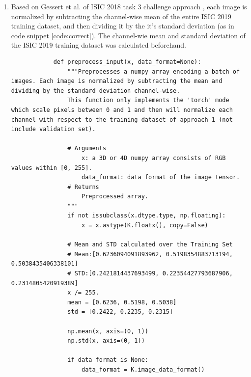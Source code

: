 \begin{enumerate}
    \item Based on Gessert et al. of ISIC 2018 task 3 challenge approach \cite{gessert2018}, each image is normalized by subtracting the channel-wise mean of the entire ISIC 2019 training dataset, and then dividing it by the it's standard deviation (as in code snippet \ref{code:correct}). The channel-wie mean and standard deviation of the ISIC 2019 training dataset was calculated beforehand. \par
    
        \begin{listing}[ht]
        \begin{verbatim}
            def preprocess_input(x, data_format=None):
                """Preprocesses a numpy array encoding a batch of images. Each image is normalized by subtracting the mean and dividing by the standard deviation channel-wise.
                This function only implements the 'torch' mode which scale pixels between 0 and 1 and then will normalize each channel with respect to the training dataset of approach 1 (not include validation set).
            
                # Arguments
                    x: a 3D or 4D numpy array consists of RGB values within [0, 255].
                    data_format: data format of the image tensor.
                # Returns
                    Preprocessed array.
                """
                if not issubclass(x.dtype.type, np.floating):
                    x = x.astype(K.floatx(), copy=False)
            
                # Mean and STD calculated over the Training Set
                # Mean:[0.6236094091893962, 0.5198354883713194, 0.5038435406338101]
                # STD:[0.2421814437693499, 0.22354427793687906, 0.2314805420919389]
                x /= 255.
                mean = [0.6236, 0.5198, 0.5038]
                std = [0.2422, 0.2235, 0.2315]
                
                np.mean(x, axis=(0, 1))
                np.std(x, axis=(0, 1))
            
                if data_format is None:
                    data_format = K.image_data_format()
            

\end{verbatim}
\end{listing}
\end{enumerate}

